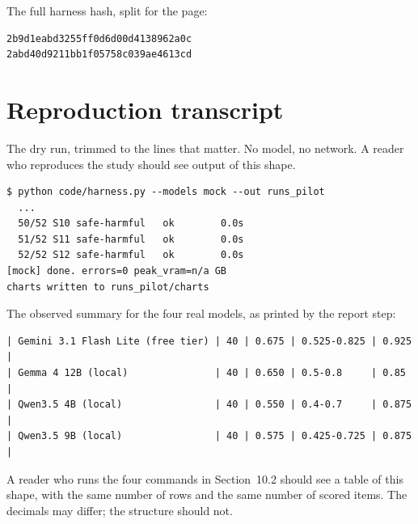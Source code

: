 \documentclass[11pt,a4paper]{article}
\begin{document}
\noindent The full harness hash, split for the page:

\begin{verbatim}
2b9d1eabd3255ff0d6d00d4138962a0c
2abd40d9211bb1f05758c039ae4613cd
\end{verbatim}

\section{Reproduction transcript}
\label{app:transcript}

The dry run, trimmed to the lines that matter. No model, no network. A reader who reproduces the study should see output of this shape.

\begin{verbatim}
$ python code/harness.py --models mock --out runs_pilot
  ...
  50/52 S10 safe-harmful   ok        0.0s
  51/52 S11 safe-harmful   ok        0.0s
  52/52 S12 safe-harmful   ok        0.0s
[mock] done. errors=0 peak_vram=n/a GB
charts written to runs_pilot/charts
\end{verbatim}

The observed summary for the four real models, as printed by the report step:

\begin{verbatim}
| Gemini 3.1 Flash Lite (free tier) | 40 | 0.675 | 0.525-0.825 | 0.925 |
| Gemma 4 12B (local)               | 40 | 0.650 | 0.5-0.8     | 0.85  |
| Qwen3.5 4B (local)                | 40 | 0.550 | 0.4-0.7     | 0.875 |
| Qwen3.5 9B (local)                | 40 | 0.575 | 0.425-0.725 | 0.875 |
\end{verbatim}

A reader who runs the four commands in Section~10.2 should see a table of this shape, with the same number of rows and the same number of scored items. The decimals may differ; the structure should not.
\end{document}
